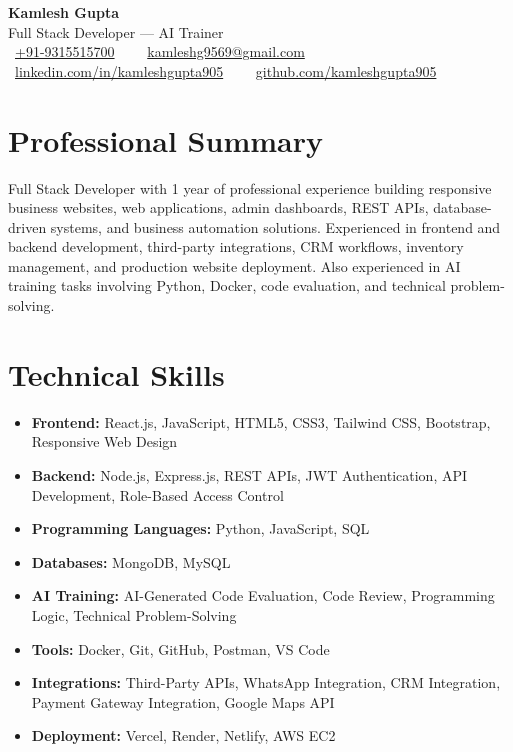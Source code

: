 \documentclass[a4paper,10pt]{article}
\begin{document}
\pagestyle{empty}

\begin{center}
    {\LARGE \textbf{Kamlesh Gupta}}\\[3pt]
    {\large Full Stack Developer --- AI Trainer}\\[4pt]
    \faPhone\ \href{tel:+919315515700}{+91-9315515700} \ \textbar\ \ \faEnvelope\ \href{mailto:kamleshg9569@gmail.com}{kamleshg9569@gmail.com}\\[3pt]
    \faLinkedin\ \href{https://www.linkedin.com/in/kamleshgupta905}{linkedin.com/in/kamleshgupta905} \ \textbar\ \ \faGithub\ \href{https://github.com/kamleshgupta905}{github.com/kamleshgupta905}
\end{center}

\vspace{-4pt}

\section*{Professional Summary}
\vspace{2pt}
Full Stack Developer with 1 year of professional experience building responsive business websites, web applications, admin dashboards, REST APIs, database-driven systems, and business automation solutions.
Experienced in frontend and backend development, third-party integrations, CRM workflows, inventory management, and production website deployment. Also experienced in AI training tasks involving Python, Docker, code evaluation, and technical problem-solving.

\section*{Technical Skills}
\vspace{2pt}
\begin{itemize}
    \item \textbf{Frontend:} React.js, JavaScript, HTML5, CSS3, Tailwind CSS, Bootstrap, Responsive Web Design
    \item \textbf{Backend:} Node.js, Express.js, REST APIs, JWT Authentication, API Development, Role-Based Access Control
    \item \textbf{Programming Languages:} Python, JavaScript, SQL
    \item \textbf{Databases:} MongoDB, MySQL
    \item \textbf{AI Training:} AI-Generated Code Evaluation, Code Review, Programming Logic, Technical Problem-Solving
    \item \textbf{Tools:} Docker, Git, GitHub, Postman, VS Code
    \item \textbf{Integrations:} Third-Party APIs, WhatsApp Integration, CRM Integration, Payment Gateway Integration, Google Maps API
    \item \textbf{Deployment:} Vercel, Render, Netlify, AWS EC2
\end{itemize}
\end{document}
